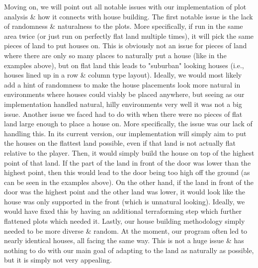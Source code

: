 \documentclass[11pt, oneside]{article}
\begin{document}
\begin{normalsize}
Moving on, we will point out all notable issues with our implementation of plot analysis \& how it connects with house building. 
The first notable issue is the lack of randomness \& naturalness to the plots. 
More specifically, if run in the same area twice (or just run on perfectly flat land multiple times), it will pick the same pieces of land to put houses on. 
This is obviously not an issue for pieces of land where there are only so many places to naturally put a house (like in the examples above), but on flat land this leads to "suburban" looking houses (i.e., houses lined up in a row \& column type layout). 
Ideally, we would most likely add a hint of randomness to make the house placements look more natural in environments where houses could viably be placed anywhere, but seeing as our implementation handled natural, hilly environments very well it was not a big issue. 
Another issue we faced had to do with when there were no pieces of flat land large enough to place a house on. 
More specifically, the issue was our lack of handling this. 
In its current version, our implementation will simply aim to put the houses on the flattest land possible, even if that land is not actually flat relative to the player. 
Then, it would simply build the house on top of the highest point of that land. 
If the part of the land in front of the door was lower than the highest point, then this would lead to the door being too high off the ground (as can be seen in the examples above). 
On the other hand, if the land in front of the door was the highest point and the other land was lower, it would look like the house was only supported in the front (which is unnatural looking). 
Ideally, we would have fixed this by having an additional terraforming step which further flattened plots which needed it. 
Lastly, our house building methodology simply needed to be more diverse \& random. 
At the moment, our program often led to nearly identical houses, all facing the same way. 
This is not a huge issue \& has nothing to do with our main goal of adapting to the land as naturally as possible, but it is simply not very appealing. 


\end{normalsize}
\end{document}
